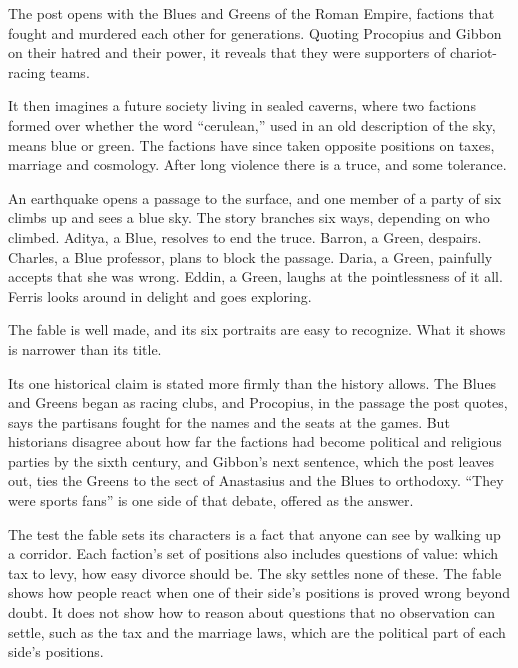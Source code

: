\begin{afterword}
\summaryhead

The post opens with the Blues and Greens of the Roman Empire, factions that fought and murdered each other for generations. Quoting Procopius and Gibbon on their hatred and their power, it reveals that they were supporters of chariot-racing teams.

It then imagines a future society living in sealed caverns, where two factions formed over whether the word ``cerulean,'' used in an old description of the sky, means blue or green. The factions have since taken opposite positions on taxes, marriage and cosmology. After long violence there is a truce, and some tolerance.

An earthquake opens a passage to the surface, and one member of a party of six climbs up and sees a blue sky. The story branches six ways, depending on who climbed. Aditya, a Blue, resolves to end the truce. Barron, a Green, despairs. Charles, a Blue professor, plans to block the passage. Daria, a Green, painfully accepts that she was wrong. Eddin, a Green, laughs at the pointlessness of it all. Ferris looks around in delight and goes exploring.

\responsehead

The fable is well made, and its six portraits are easy to recognize. What it shows is narrower than its title.

Its one historical claim is stated more firmly than the history allows. The Blues and Greens began as racing clubs, and Procopius, in the passage the post quotes, says the partisans fought for the names and the seats at the games. But historians disagree about how far the factions had become political and religious parties by the sixth century, and Gibbon's next sentence, which the post leaves out, ties the Greens to the sect of Anastasius and the Blues to orthodoxy. ``They were sports fans'' is one side of that debate, offered as the answer.

The test the fable sets its characters is a fact that anyone can see by walking up a corridor. Each faction's set of positions also includes questions of value: which tax to levy, how easy divorce should be. The sky settles none of these. The fable shows how people react when one of their side's positions is proved wrong beyond doubt. It does not show how to reason about questions that no observation can settle, such as the tax and the marriage laws, which are the political part of each side's positions.


\end{afterword}

